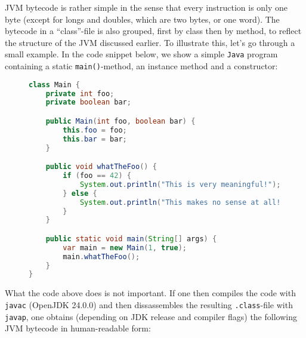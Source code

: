 JVM bytecode is rather simple in the sense that every instruction is only one byte (except for longs and doubles, which are two bytes, or one word).
The bytecode in a ``class''-file is also grouped, first by class then by method, to reflect the structure of the JVM discussed earlier.
To illustrate this, let's go through a small example. In the code snippet below, we show a simple \texttt{Java} program containing a static
\texttt{main()}-method, an instance method and a constructor:

\begin{figure}[H]
\centering 
\begin{lstlisting}[language=Java]
class Main {
    private int foo;
    private boolean bar;

    public Main(int foo, boolean bar) {
        this.foo = foo;
        this.bar = bar;
    }

    public void whatTheFoo() {
        if (foo == 42) {
            System.out.println("This is very meaningful!");
        } else {
            System.out.println("This makes no sense at all!");
        }
    }

    public static void main(String[] args) {
        var main = new Main(1, true);
        main.whatTheFoo();
    }
}
\end{lstlisting}
\caption{}
\label{}
\end{figure}

What the code above does is not important. If one then compiles the code with \texttt{javac} (OpenJDK 24.0.0) and then
dissassembles the resulting \texttt{.class}-file with \texttt{javap}, one obtains (depending on JDK release and compiler flags)
the following JVM bytecode in human-readable form:

